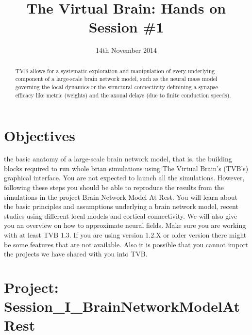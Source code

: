 \documentclass{tufte-handout}
\title{The Virtual Brain: Hands on Session \#1}
\date{14th November 2014}
\begin{document}

\newpage
\ClearWallPaper
\begin{abstract}
\noindent TVB allows for a systematic exploration and manipulation of every
underlying component of a large-scale brain network model, such as the neural
mass model governing the local dynamics  or the structural connectivity
definining a synapse efficacy like metric (weights) and the axonal delays (due to finite conduction speeds).
\begin{marginfigure}%
  \label{fig:marginfig}
\end{marginfigure}
\end{abstract}

\section{Objectives}\label{sec:objectives}

 the basic anatomy of a large-scale brain network model, that is, the building blocks required to run whole brian simulations using The Virtual Brain's (TVB's) graphical interface. You are not expected to launch all the simulations. However, following these steps you should be able to reproduce the results from the simulations in the project Brain Network Model At Rest. You will learn about the basic principles and assumptions underlying a brain network model, recent studies using different local models and cortical connectivity. We will also give you an overview on how to approximate neural fields. Make sure you are working with at least TVB 1.3. If you are using version 1.2.X or older version there might be some features that are not available. Also it is possible that you cannot import the projects we have shared with you into TVB. 


\section{Project:  Session\_I\_BrainNetworkModelAtRest}\label{sec:project_data}
\end{document}
